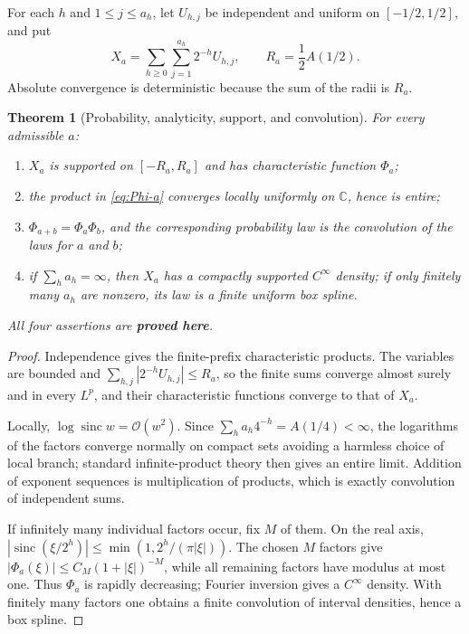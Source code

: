 \documentclass[11pt,oneside]{article}
\numberwithin{equation}{section}
\newtheorem{theorem}{Theorem}[section]
\theoremstyle{definition}
\theoremstyle{remark}
\newcommand{\C}{\mathbb C}
\newcommand{\sinc}{\operatorname{sinc}}
\newcommand{\bigO}{\mathcal O}
\newcommand{\statusproved}{\textcolor{deepgreen}{\textbf{proved here}}}
\begin{document}
For each $h$ and $1\le j\le a_h$, let $U_{h,j}$ be independent and uniform on
$[-1/2,1/2]$, and put
\begin{equation}
 X_a=\sum_{h\ge0}\sum_{j=1}^{a_h}2^{-h}U_{h,j},
 \qquad
 R_a=\frac12A(1/2).
 \label{eq:X-a}
\end{equation}
Absolute convergence is deterministic because the sum of the radii is $R_a$.

\begin{theorem}[Probability, analyticity, support, and convolution]
\label{thm:master-probability}
For every admissible $a$:
\begin{enumerate}
\item $X_a$ is supported on $[-R_a,R_a]$ and has characteristic function $\Phi_a$;
\item the product in \eqref{eq:Phi-a} converges locally uniformly on $\C$, hence is entire;
\item $\Phi_{a+b}=\Phi_a\Phi_b$, and the corresponding probability law is the convolution
      of the laws for $a$ and $b$;
\item if $\sum_ha_h=\infty$, then $X_a$ has a compactly supported $C^\infty$ density;
      if only finitely many $a_h$ are nonzero, its law is a finite uniform box spline.
\end{enumerate}
All four assertions are \statusproved.
\end{theorem}

\begin{proof}
Independence gives the finite-prefix characteristic products.  The variables are bounded and
$\sum_{h,j}|2^{-h}U_{h,j}|\le R_a$, so the finite sums converge almost surely and in every
$L^p$, and their characteristic functions converge to that of $X_a$.

Locally, $\log\sinc w=\bigO(w^2)$.  Since
$\sum_ha_h4^{-h}=A(1/4)<\infty$, the logarithms of the factors converge normally on compact
sets avoiding a harmless choice of local branch; standard infinite-product theory then gives
an entire limit.  Addition of exponent sequences is multiplication of products, which is
exactly convolution of independent sums.

If infinitely many individual factors occur, fix $M$ of them.  On the real axis,
$|\sinc(\xi/2^h)|\le\min(1,2^h/(\pi|\xi|))$.  The chosen $M$ factors give
$|\Phi_a(\xi)|\le C_M(1+|\xi|)^{-M}$, while all remaining factors have modulus at most one.
Thus $\Phi_a$ is rapidly decreasing; Fourier inversion gives a $C^\infty$ density.  With
finitely many factors one obtains a finite convolution of interval densities, hence a box
spline.
\end{proof}
\end{document}
